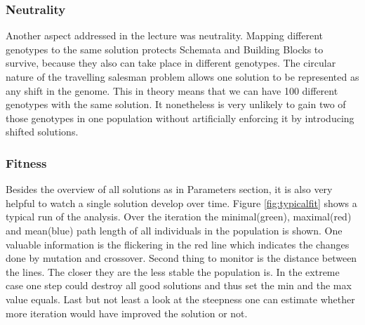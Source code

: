 \documentclass{scrartcl}
\begin{document}
 \subsubsection{Neutrality}
Another aspect addressed in the lecture was neutrality. Mapping different genotypes to the same solution protects Schemata and Building Blocks to survive, because they also can take place in different genotypes. The circular nature of the travelling salesman problem allows one solution to be represented as any shift in the genome. This in theory means that we can have 100 different genotypes with the same solution. It nonetheless is very unlikely to gain two of those genotypes in one population without artificially enforcing it by introducing shifted solutions.

\subsubsection{Fitness}
Besides the overview of all solutions as in Parameters section, it is also very helpful to watch a single solution develop over time. Figure \ref{fig:typicalfit} shows a typical run of the analysis. Over the iteration the minimal(green), maximal(red) and mean(blue) path length of all individuals in the population is shown. One valuable information is the flickering in the red line which indicates the changes done by mutation and crossover. Second thing to monitor is the distance between the lines. The closer they are the less stable the population is. In the extreme case one step could destroy all good solutions and thus set the min and the max value equals. Last but not least a look at the steepness one can estimate whether more iteration would have improved the solution or not.
\end{document}
